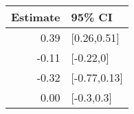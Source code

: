 \begin{tabular}{rl}
  \hline
Estimate & 95\% CI \\ 
  \hline
0.39 & [0.26,0.51] \\ 
  -0.11 & [-0.22,0] \\ 
  -0.32 & [-0.77,0.13] \\ 
  0.00 & [-0.3,0.3] \\ 
   \hline
\end{tabular}

